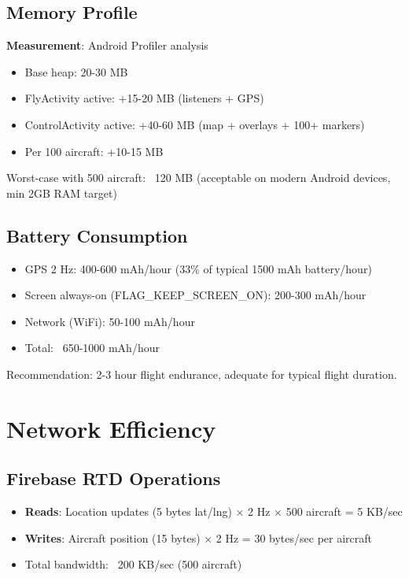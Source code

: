 \documentclass[11pt,a4paper]{report}
\begin{document}
\subsection{Memory Profile}

\textbf{Measurement}: Android Profiler analysis

\begin{itemize}
    \item Base heap: 20-30 MB
    \item FlyActivity active: +15-20 MB (listeners + GPS)
    \item ControlActivity active: +40-60 MB (map + overlays + 100+ markers)
    \item Per 100 aircraft: +10-15 MB
\end{itemize}

Worst-case with 500 aircraft: ~120 MB (acceptable on modern Android devices, min 2GB RAM target)

\subsection{Battery Consumption}

\begin{itemize}
    \item GPS 2 Hz: 400-600 mAh/hour (33\% of typical 1500 mAh battery/hour)
    \item Screen always-on (FLAG\_KEEP\_SCREEN\_ON): 200-300 mAh/hour
    \item Network (WiFi): 50-100 mAh/hour
    \item Total: ~650-1000 mAh/hour
\end{itemize}

Recommendation: 2-3 hour flight endurance, adequate for typical flight duration.

\section{Network Efficiency}

\subsection{Firebase RTD Operations}

\begin{itemize}
    \item \textbf{Reads}: Location updates (5 bytes lat/lng) × 2 Hz × 500 aircraft = 5 KB/sec
    \item \textbf{Writes}: Aircraft position (15 bytes) × 2 Hz = 30 bytes/sec per aircraft
    \item Total bandwidth: ~200 KB/sec (500 aircraft)
\end{itemize}
\end{document}
